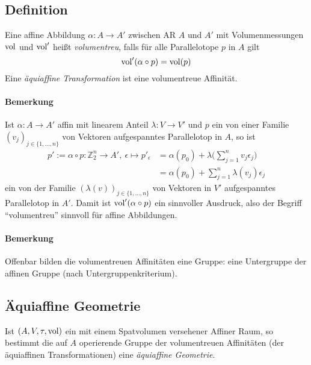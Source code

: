 \subsection{Definition}
	\begin{Definition}
		Eine affine Abbildung $ \alpha:A\to A' $ zwischen AR $ A $ und $ A' $ mit Volumenmessungen $ \operatorname{vol} $ und $ \operatorname{vol}' $ heißt \emph{volumentreu}, falls für alle Parallelotope $ p $ in $ A $ gilt
			\[ \operatorname{vol}'(\alpha\circ p)=\operatorname{vol}(p) \]
		Eine \emph{äquiaffine Transformation} ist eine volumentreue Affinität.
	\end{Definition}
\paragraph{Bemerkung}
	Ist $ \alpha:A\to A' $ affin mit linearem Anteil $ \lambda:V \to V' $ und $ p $ ein von einer Familie $ (v_j)_{j\in\{1,\dots,n\}} $ von Vektoren aufgespanntes Parallelotop in $ A $, so ist
	 \begin{align*}
	 p':= \alpha\circ p:\mathbb{Z}_2^n\to A',\ \epsilon \mapsto p'_\epsilon &= \alpha(p_0)+\lambda\Big(\sum_{j=1}^{n}v_j\epsilon_j\Big)\\
	 &= \alpha(p_0)+\sum_{j=1}^{n}\lambda(v_j)\epsilon_j
	 \end{align*}
	ein von der Familie $ (\lambda(v))_{j\in \{1,\dots,n\}} $ von Vektoren in $ V' $ aufgespanntes Parallelotop in $ A' $. Damit ist $ \operatorname{vol}'(\alpha\circ p) $ ein sinnvoller Ausdruck, also der Begriff "`volumentreu"' sinnvoll für affine Abbildungen.
\paragraph{Bemerkung}
	Offenbar bilden die volumentreuen Affinitäten eine Gruppe: eine Untergruppe der affinen Gruppe (nach Untergruppenkriterium).
\subsection{Äquiaffine Geometrie}
	\begin{Definition}
	Ist $ (A,V,\tau,\operatorname{vol}) $ ein mit einem Spatvolumen versehener Affiner Raum, so bestimmt die auf $ A $ operierende Gruppe der volumentreuen Affinitäten (der äquiaffinen Transformationen) eine \emph{äquiaffine Geometrie}.
	\end{Definition}
